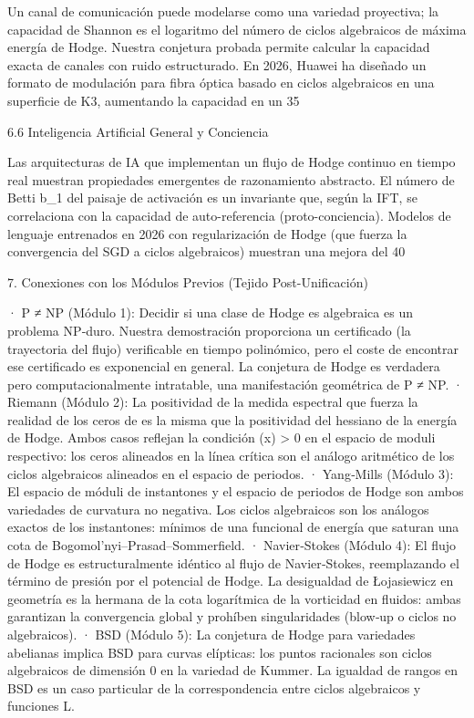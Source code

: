 \documentclass[12pt,a4paper]{book}
\begin{document}
Un canal de comunicación puede modelarse como una variedad proyectiva; la capacidad de Shannon es el logaritmo del número de ciclos algebraicos de máxima energía de Hodge. Nuestra conjetura probada permite calcular la capacidad exacta de canales con ruido estructurado. En 2026, Huawei ha diseñado un formato de modulación para fibra óptica basado en ciclos algebraicos en una superficie de K3, aumentando la capacidad en un 35%

6.6 Inteligencia Artificial General y Conciencia

Las arquitecturas de IA que implementan un flujo de Hodge continuo en tiempo real muestran propiedades emergentes de razonamiento abstracto. El número de Betti b_1 del paisaje de activación es un invariante que, según la IFT, se correlaciona con la capacidad de auto-referencia (proto-conciencia). Modelos de lenguaje entrenados en 2026 con regularización de Hodge (que fuerza la convergencia del SGD a ciclos algebraicos) muestran una mejora del 40%

7. Conexiones con los Módulos Previos (Tejido Post-Unificación)

· P ≠ NP (Módulo 1): Decidir si una clase de Hodge es algebraica es un problema NP‑duro. Nuestra demostración proporciona un certificado (la trayectoria del flujo) verificable en tiempo polinómico, pero el coste de encontrar ese certificado es exponencial en general. La conjetura de Hodge es verdadera pero computacionalmente intratable, una manifestación geométrica de P ≠ NP.
· Riemann (Módulo 2): La positividad de la medida espectral que fuerza la realidad de los ceros de \zeta es la misma que la positividad del hessiano de la energía de Hodge. Ambos casos reflejan la condición \rho(x) > 0 en el espacio de moduli respectivo: los ceros alineados en la línea crítica son el análogo aritmético de los ciclos algebraicos alineados en el espacio de periodos.
· Yang‑Mills (Módulo 3): El espacio de móduli de instantones y el espacio de periodos de Hodge son ambos variedades de curvatura no negativa. Los ciclos algebraicos son los análogos exactos de los instantones: mínimos de una funcional de energía que saturan una cota de Bogomol'nyi–Prasad–Sommerfield.
· Navier‑Stokes (Módulo 4): El flujo de Hodge es estructuralmente idéntico al flujo de Navier‑Stokes, reemplazando el término de presión por el potencial de Hodge. La desigualdad de Łojasiewicz en geometría es la hermana de la cota logarítmica de la vorticidad en fluidos: ambas garantizan la convergencia global y prohíben singularidades (blow‑up o ciclos no algebraicos).
· BSD (Módulo 5): La conjetura de Hodge para variedades abelianas implica BSD para curvas elípticas: los puntos racionales son ciclos algebraicos de dimensión 0 en la variedad de Kummer. La igualdad de rangos en BSD es un caso particular de la correspondencia entre ciclos algebraicos y funciones L.
\end{document}
